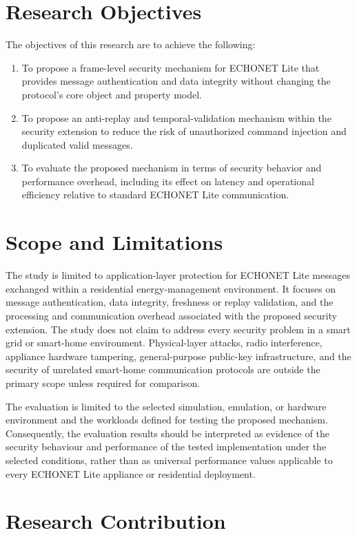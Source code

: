 \section{Research Objectives}

The objectives of this research are to achieve the following:
\begin{enumerate}[nosep]
  \item To propose a frame-level security mechanism for ECHONET Lite that provides message authentication and data integrity without changing the protocol's core object and property model.
  \item To propose an anti-replay and temporal-validation mechanism within the security extension to reduce the risk of unauthorized command injection and duplicated valid messages.
  \item To evaluate the proposed mechanism in terms of security behavior and performance overhead, including its effect on latency and operational efficiency relative to standard ECHONET Lite communication.
\end{enumerate}


\section{Scope and Limitations}

The study is limited to application-layer protection for ECHONET Lite messages exchanged within a residential energy-management environment. It focuses on message authentication, data integrity, freshness or replay validation, and the processing and communication overhead associated with the proposed security extension. The study does not claim to address every security problem in a smart grid or smart-home environment. Physical-layer attacks, radio interference, appliance hardware tampering, general-purpose public-key infrastructure, and the security of unrelated smart-home communication protocols are outside the primary scope unless required for comparison.

The evaluation is limited to the selected simulation, emulation, or hardware environment and the workloads defined for testing the proposed mechanism. Consequently, the evaluation results should be interpreted as evidence of the security behaviour and performance of the tested implementation under the selected conditions, rather than as universal performance values applicable to every ECHONET Lite appliance or residential deployment.

\section{Research Contribution}

